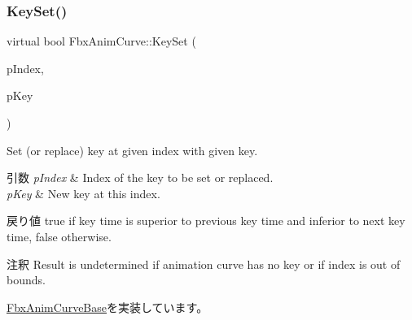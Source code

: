 \subsubsection{\texorpdfstring{Key\+Set()}{KeySet()}\hspace{0.1cm}{\footnotesize\ttfamily [1/2]}}
{\footnotesize\ttfamily virtual bool Fbx\+Anim\+Curve\+::\+Key\+Set (\begin{DoxyParamCaption}\item[{int}]{p\+Index,  }\item[{\hyperlink{class_fbx_anim_curve_key_base}{Fbx\+Anim\+Curve\+Key\+Base} \&}]{p\+Key }\end{DoxyParamCaption})\hspace{0.3cm}{\ttfamily [pure virtual]}}

Set (or replace) key at given index with given key. 
\begin{DoxyParams}{引数}
{\em p\+Index} & Index of the key to be set or replaced. \\
\hline
{\em p\+Key} & New key at this index. \\
\hline
\end{DoxyParams}
\begin{DoxyReturn}{戻り値}
{\ttfamily true} if key time is superior to previous key time and inferior to next key time, {\ttfamily false} otherwise. 
\end{DoxyReturn}
\begin{DoxyRemark}{注釈}
Result is undetermined if animation curve has no key or if index is out of bounds. 
\end{DoxyRemark}


\hyperlink{class_fbx_anim_curve_base_a1a66d683a6013b5eb41d128dcbbccd4a}{Fbx\+Anim\+Curve\+Base}を実装しています。

\mbox{\label{class_fbx_anim_curve_a70bb71da0c56a32be961384c015bb812}} 
